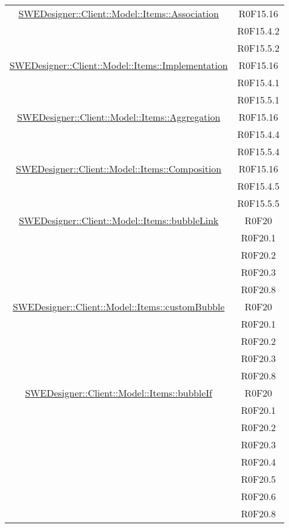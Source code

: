 \documentclass[../DefinizioneDiProdotto.tex]{subfiles}
\begin{document}
\begin{longtable}{|c|c|}
				\hyperlink{SWEDesigner::Client::Model::Items::Association}{SWEDesigner::Client::Model::Items::Association}
				& R0F15.16\\
				& R0F15.4.2\\
				& R0F15.5.2\\
				\hline

				\hyperlink{SWEDesigner::Client::Model::Items::Implementation}{SWEDesigner::Client::Model::Items::Implementation}
				& R0F15.16\\
				& R0F15.4.1\\
				& R0F15.5.1\\
				\hline

				\hyperlink{SWEDesigner::Client::Model::Items::Aggregation}{SWEDesigner::Client::Model::Items::Aggregation}
				& R0F15.16\\
				& R0F15.4.4\\
				& R0F15.5.4\\
				\hline

				\hyperlink{SWEDesigner::Client::Model::Items::Composition}{SWEDesigner::Client::Model::Items::Composition}
				& R0F15.16\\
				& R0F15.4.5\\
				& R0F15.5.5\\
				\hline

				\hyperlink{SWEDesigner::Client::Model::Items::bubbleLink}{SWEDesigner::Client::Model::Items::bubbleLink}
				& R0F20\\
				& R0F20.1\\
				& R0F20.2\\
				& R0F20.3\\
				& R0F20.8\\
				\hline

				\hyperlink{SWEDesigner::Client::Model::Items::customBubble}{SWEDesigner::Client::Model::Items::customBubble}
				& R0F20\\
				& R0F20.1\\
				& R0F20.2\\
				& R0F20.3\\
				& R0F20.8\\
				\hline

				\hyperlink{SWEDesigner::Client::Model::Items::bubbleIf}{SWEDesigner::Client::Model::Items::bubbleIf}
				& R0F20\\
				& R0F20.1\\
				& R0F20.2\\
				& R0F20.3\\
				& R0F20.4\\
				& R0F20.5\\
				& R0F20.6\\
				& R0F20.8\\
				\hline


\end{longtable}
\end{document}
